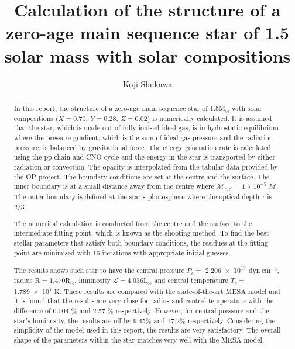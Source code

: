 \documentclass[twocolumn]{aastex631}
\begin{document}
\title{Calculation of the structure of a zero-age main sequence star of 1.5 solar mass with solar compositions}


\author[0000-0002-2798-2943]{Koji Shukawa}


\begin{abstract}

	In this report, the structure of a zero-age main sequence star of 1.5M$_\odot$ with solar compositions ($X = 0.70, ~Y = 0.28, ~Z = 0.02$) is numerically calculated. It is assumed that the star, which is made out of fully ionised ideal gas, is in hydrostatic equilibrium where the pressure gradient, which is the sum of ideal gas pressure and the radiation pressure, is balanced by gravitational force. The energy generation rate is calculated using the pp chain and CNO cycle and the energy in the star is transported by either radiation or convection. The opacity is interpolated from the tabular data provided by the OP project. The boundary conditions are set at the centre and the surface. The inner boundary is at a small distance away from the centre where $\mathcal{M}_{r, {c^\prime}} = 1 \times 10^{-5} ~ \mathcal{M}$. The outer boundary is defined at the star's photosphere where the optical depth $\tau$ is 2/3.

	The numerical calculation is conducted from the centre and the surface to the intermediate fitting point, which is known as the shooting method. To find the best stellar parameters that satisfy both boundary conditions, the residues at the fitting point are minimised with 16 iterations with appropriate initial guesses.

	The results shows such star to have the central pressure $P_c = $ \num{2.206e17} $\mathrm{dyn ~ cm^{-3}}$, radius $\mathrm{R} = 1.470 \mathrm{R}_\odot$, luminosity $\mathcal{L} = 4.036  \mathrm{L}_\odot$ and central temperature $T_c = $ \num{1.789e7} $\mathrm{K}$. These results are compared with the state-of-the-art MESA model and it is found that the results are very close for radius and central temperature with the difference of 0.004 \% and 2.57 \% respectively. However, for central pressure and the star's luminosity, the results are off by 9.45\% and 17.2\% respectively. Considering the simplicity of the model used in this report, the results are very satisfactory. The overall shape of the parameters within the star matches very well with the MESA model.
	
\end{abstract}
\end{document}
